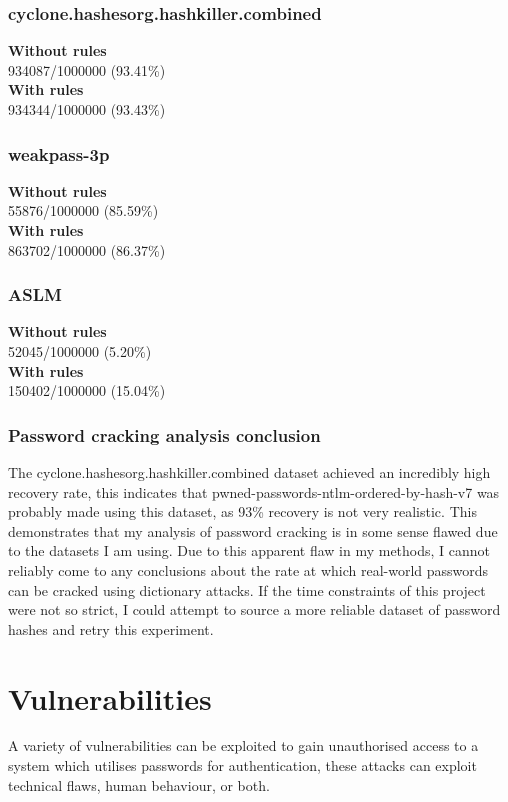 \documentclass[11pt]{article}
\begin{document}
\subsubsection{cyclone.hashesorg.hashkiller.combined}
\textbf{Without rules}\\
934087/1000000 (93.41\%)\\
\textbf{With rules}\\
934344/1000000 (93.43\%)\\
\subsubsection{weakpass-3p}
\textbf{Without rules}\\
55876/1000000 (85.59\%)\\
\textbf{With rules}\\
863702/1000000 (86.37\%)
\subsubsection{ASLM}
\textbf{Without rules}\\
52045/1000000 (5.20\%)\\
\textbf{With rules}\\
150402/1000000 (15.04\%)
\subsubsection{Password cracking analysis conclusion}
The cyclone.hashesorg.hashkiller.combined dataset achieved an incredibly high recovery rate, this indicates that pwned-passwords-ntlm-ordered-by-hash-v7 was probably made using this dataset, as 93\% recovery is not very realistic.
This demonstrates that my analysis of password cracking is in some sense flawed due to the datasets I am using.
Due to this apparent flaw in my methods, I cannot reliably come to any conclusions about the rate at which real-world passwords can be cracked using dictionary attacks.
If the time constraints of this project were not so strict, I could attempt to source a more reliable dataset of password hashes and retry this experiment.


\section{Vulnerabilities} \label{VULN}
A variety of vulnerabilities can be exploited to gain unauthorised access to a system which utilises passwords for authentication, these attacks can exploit technical flaws, human behaviour, or both.
\end{document}

